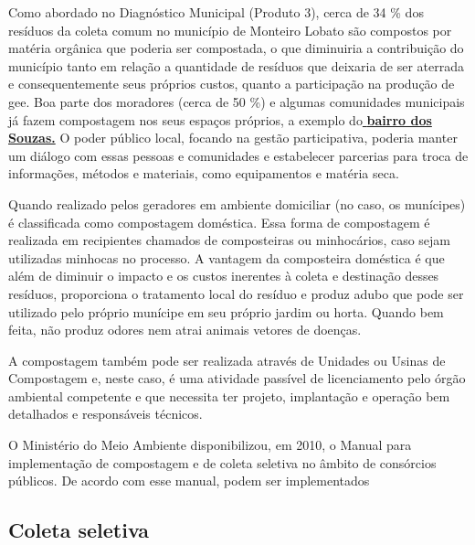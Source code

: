 Como abordado no Diagnóstico Municipal (Produto 3), cerca de 34 \% dos resíduos da coleta comum no município de Monteiro Lobato são compostos por matéria orgânica que poderia ser compostada, o que diminuiria a contribuição do município tanto em relação a quantidade de resíduos que deixaria de ser aterrada e consequentemente seus próprios custos, quanto a participação na produção de \gls{gee}. Boa parte dos moradores (cerca de 50 \%) e algumas comunidades municipais já fazem compostagem nos seus espaços próprios, a exemplo do\underline{\textbf{ bairro dos Souzas.}} O poder público local, focando na gestão participativa, poderia manter um diálogo com essas pessoas e comunidades e estabelecer parcerias para troca de informações, métodos e materiais, como equipamentos e matéria seca.

Quando realizado pelos geradores em ambiente domiciliar (no caso, os munícipes) é classificada como compostagem doméstica. Essa forma de compostagem é realizada em recipientes chamados de composteiras ou minhocários, caso sejam utilizadas minhocas no processo. A vantagem da composteira doméstica é que além de diminuir o impacto e os custos inerentes à coleta e destinação desses resíduos, proporciona o tratamento local do resíduo e produz adubo que pode ser utilizado pelo próprio munícipe em seu próprio jardim ou horta. Quando bem feita, não produz odores nem atrai animais vetores de doenças.

A compostagem também pode ser realizada através de Unidades ou Usinas de Compostagem e, neste caso, é uma atividade passível de licenciamento pelo órgão ambiental competente e que necessita ter projeto, implantação e operação bem detalhados e responsáveis técnicos. 

O Ministério do Meio Ambiente disponibilizou, em 2010, o Manual para implementação de compostagem e de coleta seletiva no âmbito de consórcios públicos. De acordo com esse manual, podem ser implementados  





\subsection{Coleta seletiva}




